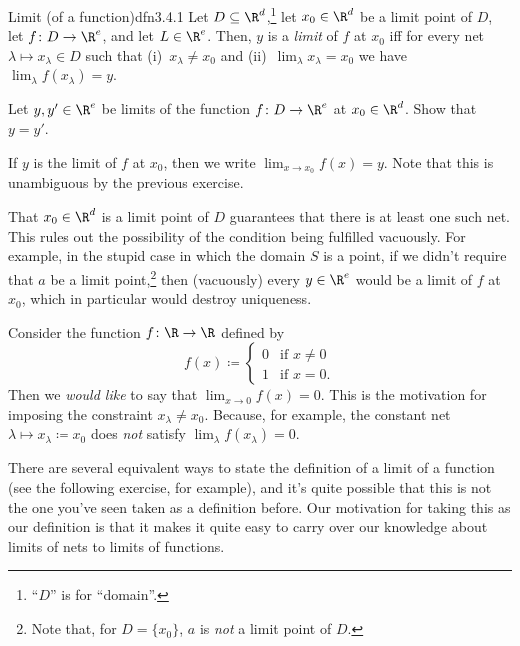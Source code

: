 \begin{dfn}{Limit (of a function)}{dfn3.4.1}
Let $D\subseteq \R ^d$,\footnote{``$D$'' is for ``domain''.} let $x_0\in \R ^d$ be a limit point of $D$, let $f\colon D\rightarrow \R ^e$, and let $L\in \R ^e$.  Then, $y$ is a \emph{limit} of $f$ at $x_0$ iff for every net $\lambda \mapsto x_\lambda \in D$ such that (i)~$x_\lambda \neq x_0$ and (ii)~$\lim _\lambda x_\lambda =x_0$ we have $\lim _\lambda f(x_\lambda )=y$.
\begin{exr}{}{}
Let $y,y'\in \R ^e$ be limits of the function $f\colon D\rightarrow \R ^e$ at $x_0\in \R ^d$.  Show that $y=y'$.
\end{exr}
\begin{rmk}
If $y$ is the limit of $f$ at $x_0$, then we write $\lim _{x\to x_0}f(x)=y$.  Note that this is unambiguous by the previous exercise.
\end{rmk}
\begin{rmk}
That $x_0\in \R ^d$ is a limit point of $D$ guarantees that there is at least one such net.  This rules out the possibility of the condition being fulfilled vacuously.  For example, in the stupid case in which the domain $S$ is a point, if we didn't require that $a$ be a limit point,\footnote{Note that, for $D=\{ x_0\}$, $a$ is \emph{not} a limit point of $D$.} then (vacuously) every $y\in \R ^e$ would be a limit of $f$ at $x_0$, which in particular would destroy uniqueness.
\end{rmk}
\begin{rmk}
Consider the function $f\colon \R \rightarrow \R$ defined by
\begin{equation}
f(x)\coloneqq \begin{cases}0 & \text{if }x\neq 0 \\ 1 & \text{if }x=0.\end{cases}
\end{equation}
Then we \emph{would like} to say that $\lim _{x\to 0}f(x)=0$.  This is the motivation for imposing the constraint $x_\lambda \neq x_0$.  Because, for example, the constant net $\lambda \mapsto x_\lambda \coloneqq x_0$ does \emph{not} satisfy $\lim _\lambda f(x_\lambda )=0$.
\end{rmk}
\begin{rmk}
There are several equivalent ways to state the definition of a limit of a function (see the following exercise, for example), and it's quite possible that this is not the one you've seen taken as a definition before.  Our motivation for taking this as our definition is that it makes it quite easy to carry over our knowledge about limits of nets to limits of functions.
\end{rmk}
\end{dfn}
